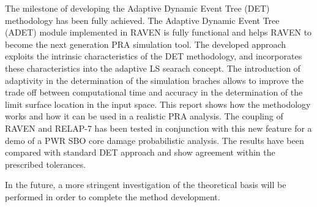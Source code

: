 \label{sec:conclusions}
The milestone of developing the Adaptive Dynamic Event Tree (DET) methodology has been fully achieved. The Adaptive Dynamic Event Tree (ADET) module implemented in RAVEN is fully functional and helps RAVEN to become the next generation PRA simulation tool. The developed approach exploits the intrinsic characteristics of the DET methodology, and incorporates these characteristics into the adaptive LS searach concept. The introduction of adaptivity in the determination of the simulation braches allows to improve the trade off between computational time and accuracy in the determination of the limit surface location in the input space. This report shows how the methodology works and how it can be used in a realistic PRA analysis. The coupling of RAVEN and RELAP-7 has been tested in conjunction with this new feature for a demo of a PWR SBO core damage probabilistic analysis. The results have been compared with standard DET approach and show agreement within the prescribed tolerances.

In the future, a more stringent investigation of the theoretical basis will be performed in order to complete the method development.


